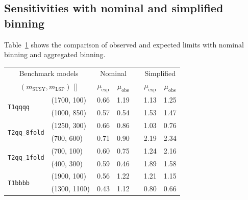 \clearpage
\subsection{Sensitivities with nominal and simplified binning}
\label{app:nominal_vs_aggregated}
Table~\ref{tab:aggr_limits} shows the comparison of observed and expected limits with 
nominal binning and aggregated binning.

\begin{table}[!t]
  \label{tab:aggr_limits}
  \centering
  \begin{tabular}{ llccccc }
    \hline
    \multicolumn{2}{c}{Benchmark models}    & \multicolumn{2}{c}{Nominal}
                                            & 
                                            & \multicolumn{2}{c}{Simplified}             \\ [0.3ex]
    \cline{3-4}
    \cline{6-7}
    \multicolumn{2}{c}{$(m_{\text{SUSY}}, m_{\mathrm{LSP}})$ [\GeVns{}]} 
                                            & $\mu_{\text{exp}}$
                                            & $\mu_{\text{obs}}$
                                            & 
                                            & $\mu_{\text{exp}}$
                                            & $\mu_{\text{obs}}$                         \\ [0.3ex]
    \hline
    \multirow{2}{*}{\texttt{T1qqqq}}        & (1700, 100)   & 0.66 & 1.19 &  & 1.13 & 1.25 \\
                                            & (1000, 850)   & 0.57 & 0.54 &  & 1.53 & 1.47 \\ [0.5ex]
    \multirow{2}{*}{\texttt{T2qq\_8fold}}   & (1250, 300)   & 0.66 & 0.86 &  & 1.03 & 0.76 \\
                                            & (700, 600)    & 0.71 & 0.90 &  & 2.19 & 2.34 \\ [0.5ex]
    \multirow{2}{*}{\texttt{T2qq\_1fold}}   & (700, 100)    & 0.60 & 0.75 &  & 1.24 & 2.16 \\
                                            & (400, 300)    & 0.59 & 0.46 &  & 1.89 & 1.58 \\ [0.5ex]
    \multirow{2}{*}{\texttt{T1bbbb}}        & (1900, 100)   & 0.56 & 1.22 &  & 1.21 & 1.15 \\
                                            & (1300, 1100)  & 0.43 & 1.12 &  & 0.80 & 0.66 \\ [0.5ex]

\end{tabular}
\end{table}
